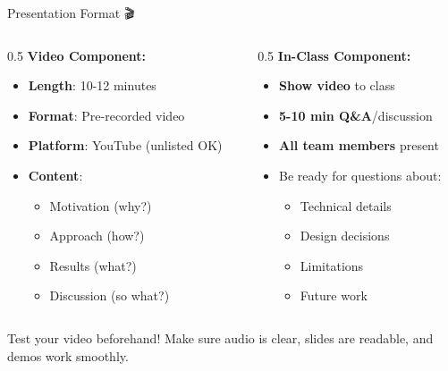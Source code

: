 \documentclass[aspectratio=169]{beamer}
\begin{document}
\begin{frame}[shrink=10]{Presentation Format 🎬}
\begin{columns}
\begin{column}{0.5\textwidth}
\textbf{Video Component:}
\begin{itemize}\setlength{\itemsep}{0pt}
    \item \textbf{Length}: 10-12 minutes
    \item \textbf{Format}: Pre-recorded video
    \item \textbf{Platform}: YouTube (unlisted OK)
    \item \textbf{Content}:
    \begin{itemize}\setlength{\itemsep}{0pt}
        \item Motivation (why?)
        \item Approach (how?)
        \item Results (what?)
        \item Discussion (so what?)
    \end{itemize}
\end{itemize}
\end{column}

\begin{column}{0.5\textwidth}
\textbf{In-Class Component:}
\begin{itemize}\setlength{\itemsep}{0pt}
    \item \textbf{Show video} to class
    \item \textbf{5-10 min Q\&A}/discussion
    \item \textbf{All team members} present
    \item Be ready for questions about:
    \begin{itemize}\setlength{\itemsep}{0pt}
        \item Technical details
        \item Design decisions
        \item Limitations
        \item Future work
    \end{itemize}
\end{itemize}
\end{column}
\end{columns}

\vspace{0.3cm}

\begin{protip}
Test your video beforehand! Make sure audio is clear, slides are readable, and demos work smoothly.
\end{protip}
\end{frame}
\end{document}
